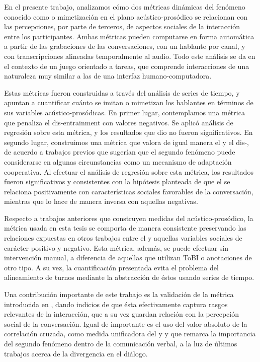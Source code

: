 En el presente trabajo, analizamos cómo dos métricas dinámicas del fenómeno conocido como \entrainment o mimetización en el plano acústico-prosódico se relacionan con las percepciones, por parte de terceros, de aspectos sociales de la interacción entre los participantes. Ambas métricas pueden computarse en forma automática a partir de las grabaciones de las conversaciones, con un hablante por canal, y con transcripciones  alineadas temporalmente al audio. Todo este análisis se da en el contexto de un juego orientado a tareas, que comprende interacciones de una naturaleza muy similar a las de una interfaz humano-computadora.

Estas métricas fueron construidas a través del análisis de series de tiempo, y apuntan a cuantificar cuánto se imitan o mimetizan los hablantes en términos de sus variables acústico-prosódicas. En primer lugar, contemplamos una métrica que penaliza el dis-entrainment con valores negativos. Se aplicó análisis de regresión sobre esta métrica, y los resultados que dio no fueron significativos. En segundo lugar, construimos una métrica que valora de igual manera el \entrainment y el dis-\entrainment, de acuerdo a trabajos previos que sugerían que el segundo fenómeno puede considerarse en algunas circunstancias como un mecanismo de adaptación cooperativa. Al efectuar el análisis de regresión sobre esta métrica, los resultados fueron significativos y consistentes con la hipótesis planteada de que el \entrainment se relaciona positivamente con características sociales favorables de la conversación, mientras que lo hace de manera inversa con aquellas negativas.

Respecto a trabajos anteriores que construyen medidas del \entrainment acústico-prosódico, la métrica usada en esta tesis se comporta de manera consistente preservando las relaciones expuestas en otros trabajos entre el \entrainment y aquellas variables sociales de carácter positivo y negativo. Esta métrica, además, se puede efectuar sin intervención manual, a diferencia de aquellas que utilizan ToBI o anotaciones de otro tipo. A su vez, la cuantificación presentada evita el problema del alineamiento de turnos mediante la abstracción de éstos usando series de tiempo.

Una contribución importante de este trabajo es la validación de la métrica introducida en \cite{KOU2008.2}, dando indicios de que ésta efectivamente captura rasgos relevantes de la interacción, que a su vez guardan relación con la percepción social de la conversación. Igual de importante es el uso del valor absoluto de la correlación cruzada, como medida unificadora del \entrainment y \disentrainment y que remarca la importancia del segundo fenómeno dentro de la comunicación verbal, a la luz de últimos trabajos acerca de la divergencia en el diálogo.

